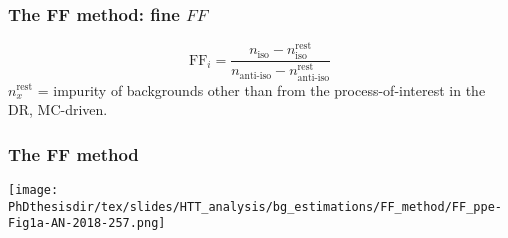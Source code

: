 \begin{frame}
\frametitle{The FF method: fine $\mathit{FF}$}

\begin{equation*}
\mathrm{FF}_i = \frac{n_\text{iso} - n_\text{iso}^\text{rest}}{n_\text{anti-iso} - n_\text{anti-iso}^\text{rest}}
\end{equation*}
{\small $n_x^\text{rest}$ = impurity of backgrounds other than from the process-of-interest in the DR, MC-driven.}
\end{frame}

\begin{frame}
\frametitle{The FF method}
\begin{center}
\texttt{[image: \\PhDthesisdir/tex/slides/HTT\_analysis/bg\_estimations/FF\_method/FF\_ppe-Fig1a-AN-2018-257.png]}
\end{center}
\end{frame}